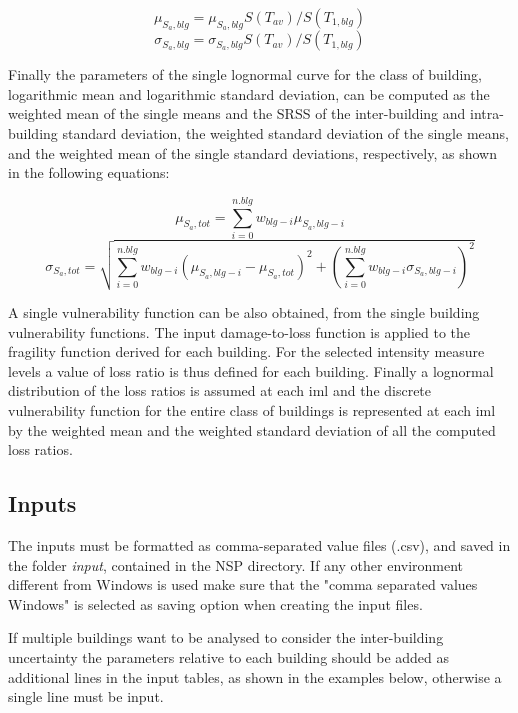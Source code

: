\begin{equation}
\mu_{S_a, blg} = \mu_{S_a, blg} S(T_{av})/ S(T_{1, blg})
\end{equation}
\begin{equation}
\sigma_{S_a, blg} = \sigma_{S_a, blg} S(T_{av})/ S(T_{1, blg})
\label{eq:Sa(Tav)}
\end{equation}

Finally the parameters of the single lognormal curve for the class of building, logarithmic mean and logarithmic standard deviation, can be computed as the weighted mean of the single means and the SRSS of the inter-building and intra-building standard deviation, the weighted standard deviation of the single means, and the weighted mean of the single standard deviations, respectively, as shown in the following equations:

\begin{equation}
\mu_{S_a, tot} = \sum_{i=0}^{n.blg} w_{blg-i} \mu_{S_a, blg-i}
\label{eq:combination-lognormals-mu}
\end{equation}
\begin{equation}
\sigma_{S_a, tot} = \sqrt{ \sum_{i=0}^{n.blg} w_{blg-i} (\mu_{S_a, blg-i}-\mu_{S_a, tot})^2+(\sum_{i=0}^{n.blg} w_{blg-i} \sigma_{S_a, blg-i})^2}
\label{eq:combination-lognormals-sigma}
\end{equation}

A single vulnerability function can be also obtained, from the single building vulnerability functions. The input damage-to-loss function is applied to the fragility function derived for each building. For the selected intensity measure levels a value of loss ratio is thus defined for each building. Finally a lognormal distribution of the loss ratios is assumed at each iml and the discrete vulnerability function for the entire class of buildings is represented at each iml by the weighted mean and the weighted standard deviation of all the computed loss ratios.

\subsection{Inputs}
\label{subsec:InputCr}
The inputs must be formatted as comma-separated value files (.csv), and saved in the folder \textit{input}, contained in the NSP directory. If any other environment different from Windows is used make sure that the "comma separated values Windows" is selected as saving option when creating the input files. 

If multiple buildings want to be analysed to consider the inter-building uncertainty the parameters relative to each building should be added as additional lines in the input tables, as shown in the examples below, otherwise a single line must be input.

